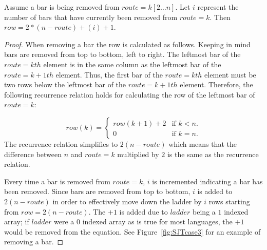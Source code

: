 \begin{lemma}
  Assume a bar is being removed from $route=k[2 \dots n]$. 
  Let $i$ represent the number of bars that have currently been removed from $route=k$. 
  Then $row=2*(n-route) + (i)+1$.
\end{lemma}
\begin{proof}
  When removing a bar the row is calculated as follows. Keeping in mind bars are removed from top to bottom, left to right.
  The leftmost bar of the $route=kth$ element is in the same column as the leftmost bar of the $route=k+1th$ element.
  Thus, the first bar of the $route=kth$ element must be two rows below the leftmost bar 
  of the $route=k+1th$ element. Therefore, the following recurrence relation holds for calculating the row of the leftmost bar of $route=k$:
  
\begin{equation}
  row(k)=\begin{cases}
    row(k+1)+2 & \text{if $k<n$}.\\
    0 & \text{if $k=n$}.
  \end{cases}
\end{equation}
The recurrence relation simplifies to $2(n-route)$ which means that the difference between $n$ and $route=k$ 
multiplied by $2$ is the same as the recurrence relation.\par 
Every time a bar is removed from $route=k$, $i$ is incremented indicating a bar has been removed. 
Since bars are removed from top to bottom, $i$ is added to $2(n-route)$ in order to effectively move 
down the ladder by $i$ rows starting from $row=2(n-route)$. The $+1$ is added due to $ladder$ being a 
$1$ indexed array; if $ladder$ were a $0$ indexed array as is true for most languages, the $+1$
would be removed from the equation.
See Figure~\ref{fig:SJTcase3} for an example of removing a bar.\pagebreak
\end{proof}

